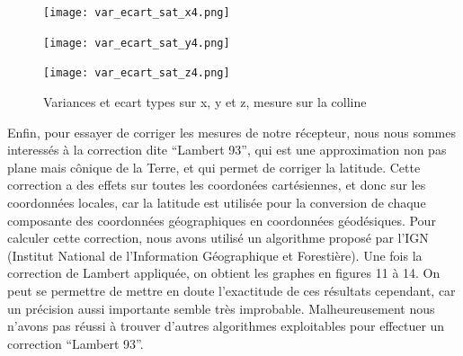 \documentclass[a4paper,12pt]{article}
\begin{document}
\begin{figure}[htbp] 
  \label{ fig3} 
  \begin{minipage}[b]{0.5\linewidth}
    \centering
    \texttt{[image: var\_ecart\_sat\_x4.png]} 
    
    \vspace{4ex}
  \end{minipage}%
  \begin{minipage}[b]{0.5\linewidth}
    \centering
    \texttt{[image: var\_ecart\_sat\_y4.png]} 
    \vspace{4ex}
  \end{minipage} 
  \begin{minipage}[b]{0.5\linewidth}
    \centering
    \texttt{[image: var\_ecart\_sat\_z4.png]} 
    \vspace{4ex}
  \end{minipage}%
   \caption{Variances et ecart types sur x, y et z, mesure sur la colline} 
\end{figure}


\newpage

Enfin, pour essayer de corriger les mesures de notre récepteur, nous nous sommes interessés à la correction dite ``Lambert 93'', qui est une approximation non pas plane mais cônique de la Terre, et qui permet de corriger la latitude. Cette correction a des effets sur toutes les coordonées cartésiennes, et donc sur les coordonnées locales, car la latitude est utilisée pour la conversion de chaque composante des coordonnées géographiques en coordonnées géodésiques. Pour calculer cette correction, nous avons utilisé un algorithme proposé par l'IGN (Institut National de l'Information Géographique et Forestière). Une fois la correction de Lambert appliquée, on obtient les graphes en figures 11 à 14. On peut se permettre de mettre en doute l'exactitude de ces résultats cependant, car un précision aussi importante semble très improbable. Malheureusement nous n'avons pas réussi à trouver d'autres algorithmes exploitables pour effectuer un correction ``Lambert 93''.
\end{document}
